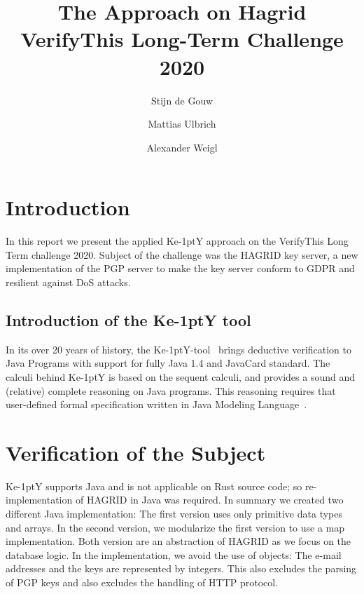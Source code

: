 \documentclass{llncs}
\title{The \KeY Approach on Hagrid
  \\{\small VerifyThis Long-Term Challenge 2020 }}
\author{ Stijn de Gouw \and Mattias Ulbrich \and Alexander Weigl }
\institute{Open University \and Karlsruhe Institute of Technology}
\newcommand{\KeY}{Ke\kern-1ptY\xspace}
\begin{document}
\maketitle

\section{Introduction}

In this report we present the applied \KeY approach on the VerifyThis Long Term
challenge 2020. Subject of the challenge was the HAGRID key server, a new
implementation of the PGP server to make the key server conform to
GDPR and resilient against DoS attacks.



\subsection{Introduction of the \KeY tool}

In its over 20 years of history, the \KeY-tool~\cite{KeyBook2} brings deductive
verification to Java Programs with support for fully Java 1.4 and JavaCard
 standard.
%
The calculi behind \KeY is based on the sequent calculi, and provides a sound
and (relative) complete reasoning on Java programs. This reasoning requires that
user-defined formal specification written in Java Modeling Language~\cite{Jml}.


\section{Verification of the Subject}
%
\KeY supports Java and is not applicable on Rust source code; so
re-implementation of HAGRID in Java was required. In summary we created two
different Java implementation: The first version uses only primitive data types
and arrays. In the second version, we modularize the first version to use a map
implementation. Both version are an abstraction of HAGRID as we focus on the
database logic. In the implementation, we avoid the use of objects: The e-mail
addresses and the keys are represented by integers. This also excludes the
parsing of PGP keys and also excludes the handling of HTTP protocol.
\end{document}
